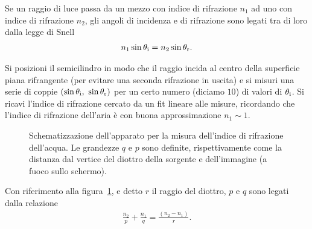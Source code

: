 \documentclass{lab1-article}
\begin{document}
\begin{article}
Se un raggio di luce passa da un mezzo con indice di rifrazione $n_1$ ad
uno con indice di rifrazione $n_2$, gli angoli di incidenza e di rifrazione
sono legati tra di loro dalla legge di Snell
\begin{align}
  n_1 \sin\theta_{\rm i} = n_2\sin\theta_{\rm r}.
\end{align}

Si posizioni il semicilindro in modo che il raggio incida al centro della
superficie piana rifrangente (per evitare una seconda rifrazione in uscita) e
si misuri una serie di coppie $(\sin\theta_{\rm i},~\sin\theta_{\rm r})$ per un
certo numero (diciamo $10$) di valori di $\theta_{\rm i}$.
Si ricavi l'indice di rifrazione cercato da un fit lineare alle misure,
ricordando che l'indice di rifrazione dell'aria \`e con buona approssimazione
$n_1 \sim 1$.



\begin{figure}[htb!]
  \caption{Schematizzazione dell'apparato per la misura dell'indice di
    rifrazione dell'acqua. Le grandezze $q$ e $p$ sono definite,
    rispettivamente come la distanza dal vertice del diottro della
    sorgente e dell'immagine (a fuoco sullo schermo).}
  \label{fig:acqua}
\end{figure}

Con riferimento alla figura~\ref{fig:acqua}, e detto $r$ il raggio del diottro,
$p$ e $q$ sono legati dalla relazione
\begin{align}\label{eq:diottro}
  \frac{n_2}{p} + \frac{n_1}{q} = \frac{(n_2 - n_1)}{r}.
\end{align}


\end{article}
\end{document}
